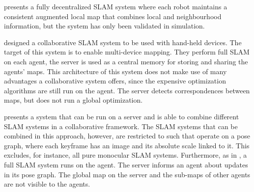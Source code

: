 \documentclass{article}
\begin{document}
 presents a fully decentralized SLAM system where
each robot maintains a consistent augmented local map that combines local and
neighbourhood information, but the system has only been validated in
simulation.

 designed a collaborative SLAM system to be used
with hand-held devices. The target of this system is to enable multi-device
mapping. They perform full SLAM on each agent, the server is used as a central
memory for storing and sharing the agents' maps. This architecture of this
system does not make use of many advantages a collaborative system offers,
since the expensive optimization algorithms are still run on the agent. The
server detects correspondences between maps, but does not run a global
optimization.

 presents a system that can be run on a server
and is able to combine different SLAM systems in a collaborative framework. The
SLAM systems that can be combined in this approach, however, are restricted to
such that operate on a pose graph, where each keyframe has an image and its
absolute scale linked to it. This excludes, for instance, all pure monocular
SLAM systems. Furthermore, as in \cite{morrison2016moarslam}, a full SLAM
system runs on the agent. The server informs an agent about updates in its pose
graph. The global map on the server and the sub-maps of other agents are not
visible to the agents.




\end{document}
